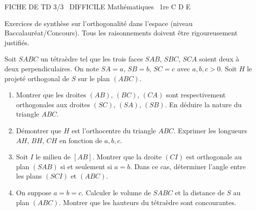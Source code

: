 \documentclass[11pt]{article}
\begin{document}
\begin{tcolorbox}[enhanced,colback=popink,colframe=popink,arc=10pt,boxrule=0pt,left=12pt,right=12pt,top=9pt,bottom=9pt]
{\color{white}\popxbold\small FICHE DE TD 3/3 \textbullet\ DIFFICILE \hfill Mathématiques \textbullet\ 1re C D E\par}
\end{tcolorbox}
\vspace{4pt}
Exercices de synthèse sur l'orthogonalité dans l'espace (niveau Baccalauréat/Concours). Tous les raisonnements doivent être rigoureusement justifiés.

\begin{exercice}
Soit $SABC$ un tétraèdre tel que les trois faces $SAB$, $SBC$, $SCA$ soient deux à deux perpendiculaires. On note $SA=a$, $SB=b$, $SC=c$ avec $a,b,c > 0$. Soit $H$ le projeté orthogonal de $S$ sur le plan $(ABC)$.
\begin{enumerate}
    \item Montrer que les droites $(AB)$, $(BC)$, $(CA)$ sont respectivement orthogonales aux droites $(SC)$, $(SA)$, $(SB)$. En déduire la nature du triangle $ABC$.
    \item Démontrer que $H$ est l'orthocentre du triangle $ABC$. Exprimer les longueurs $AH$, $BH$, $CH$ en fonction de $a,b,c$.
    \item Soit $I$ le milieu de $[AB]$. Montrer que la droite $(CI)$ est orthogonale au plan $(SAB)$ si et seulement si $a=b$. Dans ce cas, déterminer l'angle entre les plans $(SCI)$ et $(ABC)$.
    \item On suppose $a=b=c$. Calculer le volume de $SABC$ et la distance de $S$ au plan $(ABC)$. Montrer que les hauteurs du tétraèdre sont concourantes.
\end{enumerate}
\end{exercice}
\end{document}
